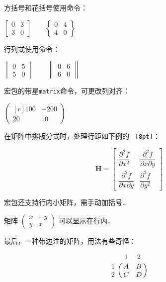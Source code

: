 方括号和花括号使用命令：
\begin{codeshow}
\centering $\begin{bmatrix}
0 & 3 \\ 3 & 0 \end{bmatrix}\qquad
\begin{Bmatrix} 0 & 4 \\
4 & 0 \end{Bmatrix}$
\end{codeshow}

行列式使用命令：
\begin{codeshow}
\centering $\begin{vmatrix}
0 & 5 \\ 5 & 0 \end{vmatrix}\qquad
\begin{Vmatrix} 0 & 6 \\
6 & 0 \end{Vmatrix}$
\end{codeshow}

宏包的带星\texttt{matrix}命令，可更改列对齐：
\begin{codeshow}
$\begin{pmatrix*}[r]
100 & -200 \\ 20 & 10
\end{pmatrix*}$
\end{codeshow}

在矩阵中排版分式时，处理行距如下例的 \texttt{ [8pt]}：
\begin{codeshow}
\[\mathbf{H}=\begin{bmatrix}
\dfrac{\partial^2 f}{\partial x^2} &
\dfrac{\partial^2 f}
{\partial x \partial y} \\[8pt]
\dfrac{\partial^2 f}
{\partial x \partial y} &
\dfrac{\partial^2 f}{\partial y^2}
\end{bmatrix}\]
\end{codeshow}

宏包还支持行内小矩阵，需手动加括号．
\begin{codeshow}
矩阵 $\left(\begin{smallmatrix}
x & -y\\ y & x\end{smallmatrix}
\right)$ 可以显示在行内．
\end{codeshow}

最后，一种带边注的矩阵，用法有些奇怪：
\begin{codeshow}
\[\bordermatrix{& 1 & 2\cr
1 & A & B \cr
2 & C & D \cr} \]
\end{codeshow}

